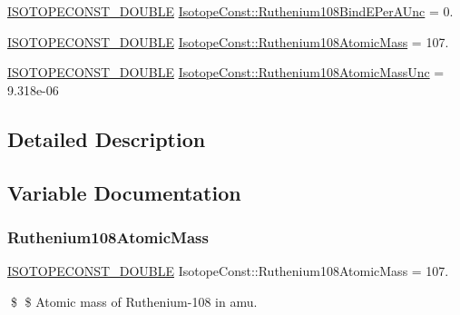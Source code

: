 \begin{DoxyCompactItemize}
\mbox{\hyperlink{group___isotope_const-_macros_ga8f45a7272ce02c0b4c65c44636ed719a}{I\+S\+O\+T\+O\+P\+E\+C\+O\+N\+S\+T\+\_\+\+D\+O\+U\+B\+LE}} \mbox{\hyperlink{group___isotope_const-_ruthenium-_ru108_ga9728dd8f751e102a0f5fd86ac26d4a1e}{Isotope\+Const\+::\+Ruthenium108\+Bind\+E\+Per\+A\+Unc}} = 0.
\item 
\mbox{\hyperlink{group___isotope_const-_macros_ga8f45a7272ce02c0b4c65c44636ed719a}{I\+S\+O\+T\+O\+P\+E\+C\+O\+N\+S\+T\+\_\+\+D\+O\+U\+B\+LE}} \mbox{\hyperlink{group___isotope_const-_ruthenium-_ru108_gabc85f0d9933c3f41d63583c205b7e49c}{Isotope\+Const\+::\+Ruthenium108\+Atomic\+Mass}} = 107.
\item 
\mbox{\hyperlink{group___isotope_const-_macros_ga8f45a7272ce02c0b4c65c44636ed719a}{I\+S\+O\+T\+O\+P\+E\+C\+O\+N\+S\+T\+\_\+\+D\+O\+U\+B\+LE}} \mbox{\hyperlink{group___isotope_const-_ruthenium-_ru108_ga2109933a1e66d1c1785e6b256d8a9561}{Isotope\+Const\+::\+Ruthenium108\+Atomic\+Mass\+Unc}} = 9.\+318e-\/06
\end{DoxyCompactItemize}


\subsection{Detailed Description}


\subsection{Variable Documentation}
\mbox{\label{group___isotope_const-_ruthenium-_ru108_gabc85f0d9933c3f41d63583c205b7e49c}} 
\subsubsection{\texorpdfstring{Ruthenium108\+Atomic\+Mass}{Ruthenium108AtomicMass}}
{\footnotesize\ttfamily \mbox{\hyperlink{group___isotope_const-_macros_ga8f45a7272ce02c0b4c65c44636ed719a}{I\+S\+O\+T\+O\+P\+E\+C\+O\+N\+S\+T\+\_\+\+D\+O\+U\+B\+LE}} Isotope\+Const\+::\+Ruthenium108\+Atomic\+Mass = 107.}

\$ \$ Atomic mass of Ruthenium-\/108 in amu. \mbox{\label{group___isotope_const-_ruthenium-_ru108_ga2109933a1e66d1c1785e6b256d8a9561}} 
